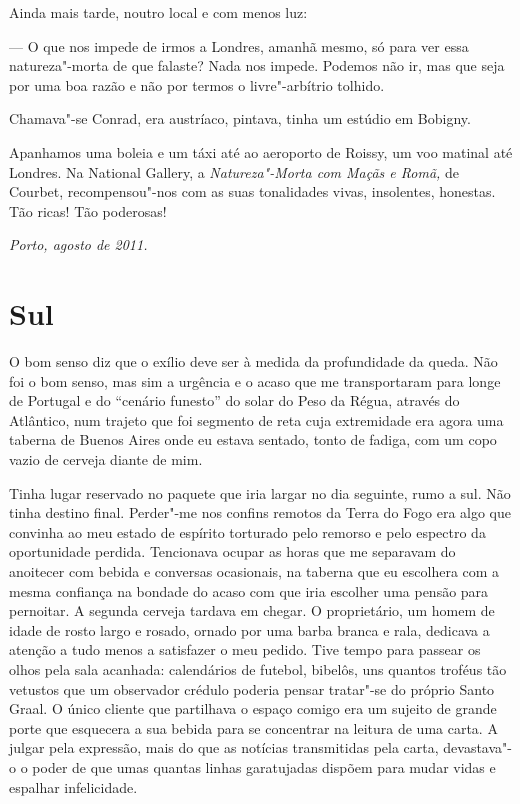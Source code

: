 Ainda mais tarde, noutro local e com menos luz:

--- O que nos impede de irmos a Londres, amanhã mesmo, só para ver essa
  natureza"-morta de que falaste? Nada nos impede. Podemos não ir, mas
  que seja por uma boa razão e não por termos o livre"-arbítrio tolhido.

Chamava"-se Conrad, era austríaco, pintava, tinha um estúdio em
Bobigny.

\pagebreak
Apanhamos uma boleia e um táxi até ao aeroporto de Roissy, um voo
matinal até Londres. Na National Gallery, a \emph{Natureza"-Morta com
Maçãs e Romã, }de Courbet, recompensou"-nos com as suas tonalidades
vivas, insolentes, honestas. Tão ricas! Tão poderosas!

\begin{flushright}
\emph{Porto, agosto de 2011.}
\end{flushright}

\chapter{Sul}

O bom senso diz que o exílio deve ser à medida da profundidade da queda.
Não foi o bom senso, mas sim a urgência e o acaso
que me transportaram para longe de Portugal e do ``cenário
funesto'' do solar do Peso da Régua, através do Atlântico, num trajeto
que foi segmento de reta cuja extremidade era agora uma taberna de
Buenos Aires onde eu estava sentado, tonto de fadiga, com um copo vazio
de cerveja diante de mim.

Tinha lugar reservado no paquete que iria largar no dia seguinte, rumo a
sul. Não tinha destino final. Perder"-me nos confins remotos da Terra do
Fogo era algo que convinha ao meu estado de espírito torturado pelo
remorso e pelo espectro da oportunidade perdida. Tencionava ocupar as
horas que me separavam do anoitecer com bebida e conversas ocasionais,
na taberna que eu escolhera com a mesma confiança na bondade do acaso
com que iria escolher uma pensão para pernoitar. A segunda cerveja
tardava em chegar. O proprietário, um homem de idade de rosto largo e
rosado, ornado por uma barba branca e rala, dedicava a atenção a tudo
menos a satisfazer o meu pedido. Tive tempo para passear os olhos pela
sala acanhada:
calendários de futebol, bibelôs, uns quantos troféus tão vetustos que
um observador crédulo poderia pensar tratar"-se do próprio Santo Graal. O
único cliente que partilhava o espaço comigo era um sujeito de grande
porte que esquecera a sua bebida para se concentrar na leitura de uma
carta. A julgar pela expressão, mais do que as notícias transmitidas
pela carta, devastava"-o o poder de que umas quantas linhas garatujadas
dispõem para mudar vidas e espalhar infelicidade.


